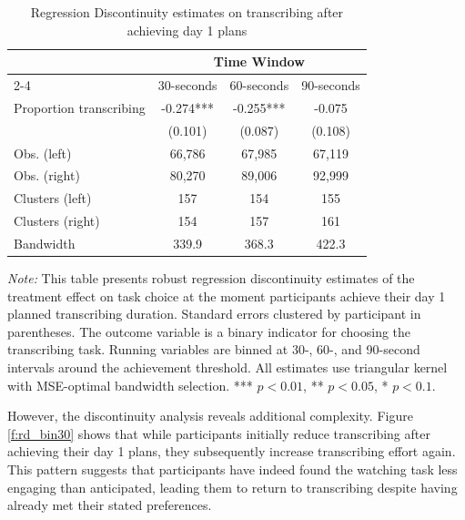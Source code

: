 \documentclass[11pt,a4paper,oneside]{article}
\begin{document}
\begin{table}[H]
  \centering
  \caption{Regression Discontinuity estimates on transcribing after achieving day 1 plans}
  \begin{threeparttable}
  \begin{tabular*}{\textwidth}{@{\extracolsep{\fill}}lccc}
  \toprule
  & \multicolumn{3}{c}{Time Window} \\
  \cmidrule(lr){2-4}
   & 30-seconds & 60-seconds & 90-seconds \\
  \midrule
  Proportion transcribing & -0.274*** & -0.255*** & -0.075 \\
  & (0.101) & (0.087) & (0.108) \\
  \midrule
  Obs. (left) & 66,786 & 67,985 & 67,119 \\
  Obs. (right) & 80,270 & 89,006 & 92,999 \\
  Clusters (left) & 157 & 154 & 155 \\
  Clusters (right) & 154 & 157 & 161 \\
  Bandwidth & 339.9 & 368.3 & 422.3 \\
  \bottomrule
  \end{tabular*}
  \begin{tablenotes}[flushleft]
  \footnotesize
  \item[] \textit{Note:} This table presents robust regression discontinuity estimates of the treatment effect on task choice at the moment participants achieve their day 1 planned transcribing duration. Standard errors clustered by participant in parentheses. The outcome variable is a binary indicator for choosing the transcribing task. Running variables are binned at 30-, 60-, and 90-second intervals around the achievement threshold. All estimates use triangular kernel with MSE-optimal bandwidth selection. *** $p<0.01$, ** $p<0.05$, * $p<0.1$.
  \end{tablenotes}
  \end{threeparttable}
  \label{tab:rd_time_windows}
\end{table}

However, the discontinuity analysis reveals additional complexity. Figure \ref{f:rd_bin30} shows that while participants initially reduce transcribing after achieving their day 1 plans, they subsequently increase transcribing effort again. This pattern suggests that participants have indeed found the watching task less engaging than anticipated, leading them to return to transcribing despite having already met their stated preferences.
\end{document}
